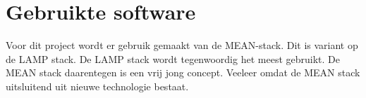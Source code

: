 \documentclass[a4paper,11pt]{article}
\begin{document}
\section{Gebruikte software}
%
%
%

Voor dit project wordt er gebruik gemaakt van de MEAN-stack. Dit is variant op de LAMP stack. De LAMP stack wordt tegenwoordig het meest gebruikt. De MEAN stack daarentegen is een vrij jong concept. Veeleer omdat de MEAN stack uitsluitend uit nieuwe technologie bestaat.
\end{document}
